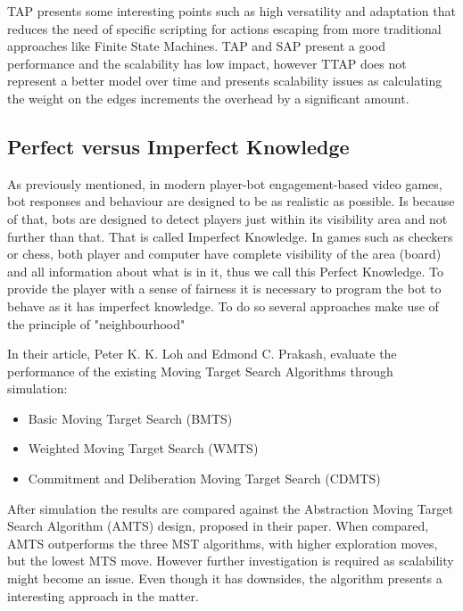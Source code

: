 \vspace{2mm}
TAP presents some interesting points such as high versatility and adaptation that reduces the need of specific scripting for actions escaping from more traditional approaches like Finite State Machines. TAP and SAP present a good performance and the scalability has low impact, however TTAP does not represent a better model over time and presents scalability issues as calculating the weight on the edges increments the overhead by a significant amount.

\subsection{Perfect versus Imperfect Knowledge}
As previously mentioned, in modern player-bot engagement-based video
games, bot responses and behaviour are designed to be
as realistic as possible. Is because of that, bots are designed to detect players just within its visibility area and not further than that. That is called Imperfect Knowledge. In games such as checkers or chess, both player and computer have complete visibility of the area (board) and all information about what is in it, thus we call this Perfect Knowledge. To provide the player with a sense of fairness it is necessary to program the bot to behave as it has imperfect knowledge. To do so several approaches make use of the principle of "neighbourhood"

\vspace{2mm}
In their article, Peter K. K. Loh and Edmond C. Prakash, evaluate the performance of the existing Moving Target Search Algorithms through simulation:
\begin{itemize}
	\item Basic Moving Target Search (BMTS)
	\item Weighted Moving Target Search (WMTS)
	\item Commitment and Deliberation Moving Target Search (CDMTS)
\end{itemize}
\vspace{2mm}
After simulation the results are compared against the Abstraction Moving Target Search Algorithm (AMTS) design, proposed in their paper. When compared, AMTS outperforms the three MST algorithms, with higher exploration moves, but the lowest MTS move. However further investigation is required as scalability might become an issue. Even though it has downsides, the algorithm presents a interesting approach in the matter.

